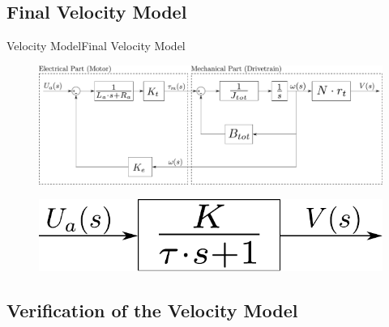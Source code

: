 \subsection{Final Velocity Model}

\begin{frame}{Velocity Model}{Final Velocity Model}

\vspace{-20pt}

\begin{figure}[H]
	\centering
	\includegraphics[scale=0.24]{Pictures/totalVelocityModelDiagramNotComplicated.pdf}   
\end{figure}

\vspace{10pt}

    \begin{figure}[H]
	\centering
	\includegraphics[scale=0.5]{Pictures/totalVelocityModelDiagramSimplified.pdf}
    
\end{figure}

\end{frame}

\subsection{Verification of the Velocity Model}

